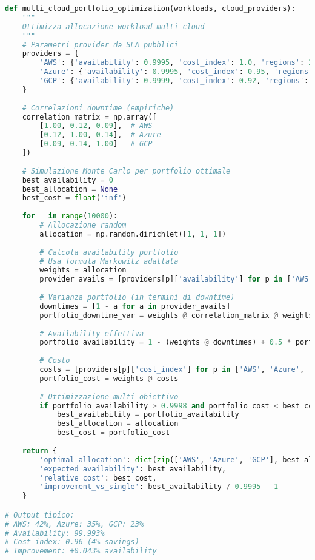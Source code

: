 \begin{lstlisting}[language=Python, caption=Ottimizzazione portfolio multi-cloud]
def multi_cloud_portfolio_optimization(workloads, cloud_providers):
    """
    Ottimizza allocazione workload multi-cloud
    """
    # Parametri provider da SLA pubblici
    providers = {
        'AWS': {'availability': 0.9995, 'cost_index': 1.0, 'regions': 25},
        'Azure': {'availability': 0.9995, 'cost_index': 0.95, 'regions': 60},
        'GCP': {'availability': 0.9999, 'cost_index': 0.92, 'regions': 28}
    }
    
    # Correlazioni downtime (empiriche)
    correlation_matrix = np.array([
        [1.00, 0.12, 0.09],  # AWS
        [0.12, 1.00, 0.14],  # Azure  
        [0.09, 0.14, 1.00]   # GCP
    ])
    
    # Simulazione Monte Carlo per portfolio ottimale
    best_availability = 0
    best_allocation = None
    best_cost = float('inf')
    
    for _ in range(10000):
        # Allocazione random
        allocation = np.random.dirichlet([1, 1, 1])
        
        # Calcola availability portfolio
        # Usa formula Markowitz adattata
        weights = allocation
        provider_avails = [providers[p]['availability'] for p in ['AWS', 'Azure', 'GCP']]
        
        # Varianza portfolio (in termini di downtime)
        downtimes = [1 - a for a in provider_avails]
        portfolio_downtime_var = weights @ correlation_matrix @ weights.T
        
        # Availability effettiva
        portfolio_availability = 1 - (weights @ downtimes) + 0.5 * portfolio_downtime_var
        
        # Costo
        costs = [providers[p]['cost_index'] for p in ['AWS', 'Azure', 'GCP']]
        portfolio_cost = weights @ costs
        
        # Ottimizzazione multi-obiettivo
        if portfolio_availability > 0.9998 and portfolio_cost < best_cost:
            best_availability = portfolio_availability
            best_allocation = allocation
            best_cost = portfolio_cost
            
    return {
        'optimal_allocation': dict(zip(['AWS', 'Azure', 'GCP'], best_allocation)),
        'expected_availability': best_availability,
        'relative_cost': best_cost,
        'improvement_vs_single': best_availability / 0.9995 - 1
    }

# Output tipico:
# AWS: 42%, Azure: 35%, GCP: 23%
# Availability: 99.993%
# Cost index: 0.96 (4% savings)
# Improvement: +0.043% availability
\end{lstlisting}

